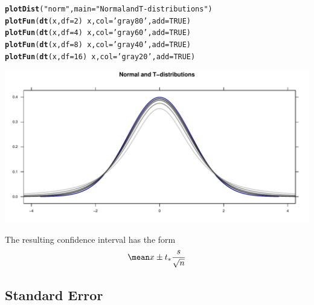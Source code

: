 \documentclass[twoside]{book}\usepackage[]{graphicx}\usepackage[]{xcolor}
\makeatletter
\def\maxwidth{ %
  \ifdim\Gin@nat@width>\linewidth
    \linewidth
  \else
    \Gin@nat@width
  \fi
}
\newcommand{\hlnum}[1]{\textcolor[rgb]{0.686,0.059,0.569}{#1}}%
\newcommand{\hlstr}[1]{\textcolor[rgb]{0.192,0.494,0.8}{#1}}%
\newcommand{\hlopt}[1]{\textcolor[rgb]{0,0,0}{#1}}%
\newcommand{\hlstd}[1]{\textcolor[rgb]{0.345,0.345,0.345}{#1}}%
\newcommand{\hlkwc}[1]{\textcolor[rgb]{0.333,0.667,0.333}{#1}}%
\newcommand{\hlkwd}[1]{\textcolor[rgb]{0.737,0.353,0.396}{\textbf{#1}}}%
\newenvironment{kframe}{%
 \def\at@end@of@kframe{}%
 \ifinner\ifhmode%
  \def\at@end@of@kframe{\end{minipage}}%
  \begin{minipage}{\columnwidth}%
 \fi\fi%
 \def\FrameCommand##1{\hskip\@totalleftmargin \hskip-\fboxsep
 \colorbox{shadecolor}{##1}\hskip-\fboxsep
     \hskip-\linewidth \hskip-\@totalleftmargin \hskip\columnwidth}%
 \MakeFramed {\advance\hsize-\width
   \@totalleftmargin\z@ \linewidth\hsize
   \@setminipage}}%
 {\par\unskip\endMakeFramed%
 \at@end@of@kframe}
\newenvironment{knitrout}{}{} %
\makeatother
\begin{document}
\begin{knitrout}
\color{fgcolor}\begin{kframe}
\begin{alltt}
\hlkwd{plotDist}\hlstd{(}\hlstr{"norm"}\hlstd{,} \hlkwc{main}\hlstd{=}\hlstr{"Normal and T-distributions"}\hlstd{)}
\hlkwd{plotFun}\hlstd{(} \hlkwd{dt}\hlstd{(x,}\hlkwc{df}\hlstd{=}\hlnum{2}\hlstd{)} \hlopt{~} \hlstd{x,} \hlkwc{col}\hlstd{=}\hlstr{'gray80'}\hlstd{,} \hlkwc{add}\hlstd{=}\hlnum{TRUE}\hlstd{)}
\hlkwd{plotFun}\hlstd{(} \hlkwd{dt}\hlstd{(x,}\hlkwc{df}\hlstd{=}\hlnum{4}\hlstd{)} \hlopt{~} \hlstd{x,} \hlkwc{col}\hlstd{=}\hlstr{'gray60'}\hlstd{,} \hlkwc{add}\hlstd{=}\hlnum{TRUE}\hlstd{)}
\hlkwd{plotFun}\hlstd{(} \hlkwd{dt}\hlstd{(x,}\hlkwc{df}\hlstd{=}\hlnum{8}\hlstd{)} \hlopt{~} \hlstd{x,} \hlkwc{col}\hlstd{=}\hlstr{'gray40'}\hlstd{,} \hlkwc{add}\hlstd{=}\hlnum{TRUE}\hlstd{)}
\hlkwd{plotFun}\hlstd{(} \hlkwd{dt}\hlstd{(x,}\hlkwc{df}\hlstd{=}\hlnum{16}\hlstd{)} \hlopt{~} \hlstd{x,} \hlkwc{col}\hlstd{=}\hlstr{'gray20'}\hlstd{,} \hlkwc{add}\hlstd{=}\hlnum{TRUE}\hlstd{)}
\end{alltt}
\end{kframe}

{\centering \includegraphics[width=\maxwidth]{figures/fig-unnamed-chunk-129-1} 

}



\end{knitrout}

The resulting confidence interval has the form
\[
\mean x \pm t_* \frac{s}{\sqrt{n}}
\]



\subsection{Standard Error}
\end{document}
